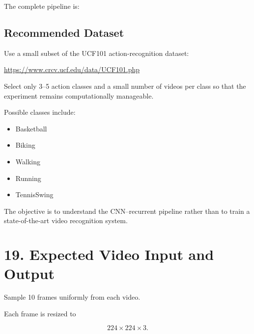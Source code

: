 \documentclass[10pt]{article}
\begin{document}
The complete pipeline is:

\begin{center}
\end{center}

\subsection*{Recommended Dataset}

Use a small subset of the UCF101 action-recognition dataset:

\url{https://www.crcv.ucf.edu/data/UCF101.php}

Select only 3--5 action classes and a small number of videos per class so that
the experiment remains computationally manageable.

Possible classes include:

\begin{itemize}
\item Basketball
\item Biking
\item Walking
\item Running
\item TennisSwing
\end{itemize}

The objective is to understand the CNN--recurrent pipeline rather than to
train a state-of-the-art video recognition system.

\section*{19. Expected Video Input and Output}

Sample 10 frames uniformly from each video.

Each frame is resized to

\[
224\times224\times3.
\]
\end{document}
